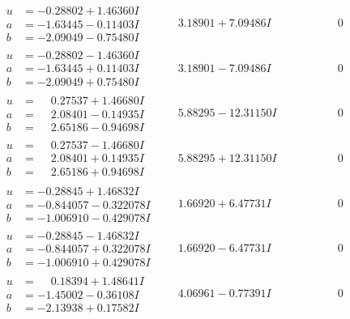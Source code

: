 \documentclass[1p]{elsarticle_modified}
\theoremstyle{definition}
\begin{document}
$$\begin{array}{c|c|c}
\begin{aligned}
u &= -0.28802 + 1.46360 I \\
a &= -1.63445 - 0.11403 I \\
b &= -2.09049 - 0.75480 I\end{aligned}
 & \phantom{-}3.18901 + 7.09486 I & \phantom{-0.000000 } 0 \\ \hline\begin{aligned}
u &= -0.28802 - 1.46360 I \\
a &= -1.63445 + 0.11403 I \\
b &= -2.09049 + 0.75480 I\end{aligned}
 & \phantom{-}3.18901 - 7.09486 I & \phantom{-0.000000 } 0 \\ \hline\begin{aligned}
u &= \phantom{-}0.27537 + 1.46680 I \\
a &= \phantom{-}2.08401 - 0.14935 I \\
b &= \phantom{-}2.65186 - 0.94698 I\end{aligned}
 & \phantom{-}5.88295 - 12.31150 I & \phantom{-0.000000 } 0 \\ \hline\begin{aligned}
u &= \phantom{-}0.27537 - 1.46680 I \\
a &= \phantom{-}2.08401 + 0.14935 I \\
b &= \phantom{-}2.65186 + 0.94698 I\end{aligned}
 & \phantom{-}5.88295 + 12.31150 I & \phantom{-0.000000 } 0 \\ \hline\begin{aligned}
u &= -0.28845 + 1.46832 I \\
a &= -0.844057 - 0.322078 I \\
b &= -1.006910 - 0.429078 I\end{aligned}
 & \phantom{-}1.66920 + 6.47731 I & \phantom{-0.000000 } 0 \\ \hline\begin{aligned}
u &= -0.28845 - 1.46832 I \\
a &= -0.844057 + 0.322078 I \\
b &= -1.006910 + 0.429078 I\end{aligned}
 & \phantom{-}1.66920 - 6.47731 I & \phantom{-0.000000 } 0 \\ \hline\begin{aligned}
u &= \phantom{-}0.18394 + 1.48641 I \\
a &= -1.45002 - 0.36108 I \\
b &= -2.13938 + 0.17582 I\end{aligned}
 & \phantom{-}4.06961 - 0.77391 I & \phantom{-0.000000 } 0 \\ \hline\begin{aligned}

\end{aligned}
\end{array}$$
\end{document}
